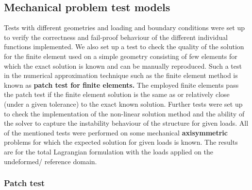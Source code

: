 \documentclass[11pt,a4paper,final]{article}
\begin{document}
\subsection{Mechanical problem test models}
Tests with different geometries and loading and boundary conditions were set up to verify the correctness and fail-proof behaviour of the different individual functions implemented. We also set up a test to check the quality of the solution for the finite element used on a simple geometry consisting of few elements for which the exact solution is known and can be manually reproduced. Such a test in the numerical approximation technique such as the finite element method is known as \textbf{patch test for finite elements.} The employed finite elements pass the patch test if the finite element solution is the same as or relatively close (under a given tolerance) to the exact known solution. Further tests were set up to check the implementation of the non-linear solution method and the ability of the solver to capture the instability behaviour of the structure for given loads. All of the mentioned tests were performed on some mechanical \textbf{axisymmetric} problems for which the expected solution for given loads is known. The results are for the total Lagrangian formulation with the loads applied on the undeformed/ reference domain. \par 

\subsubsection{Patch test}
\end{document}
